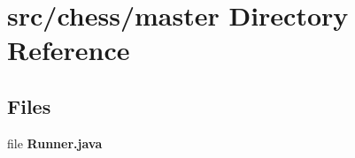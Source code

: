 \section{src/chess/master Directory Reference}
\label{dir_d7ac24b11c421a51bc41a2c8819c7d7b}
\subsection*{Files}
\begin{DoxyCompactItemize}
\item 
file {\bf Runner.\+java}
\end{DoxyCompactItemize}
